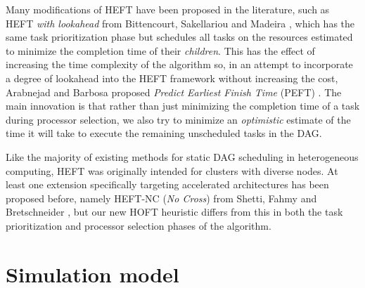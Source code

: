 \documentclass[runningheads]{llncs}
\begin{document}
Many modifications of HEFT have been proposed in the literature, such as HEFT {\em with lookahead} from Bittencourt, Sakellariou and Madeira \cite{bittencourt10}, which has the same task prioritization phase but schedules all tasks on the resources estimated to minimize the completion time of their {\em children}. This has the effect of increasing the time complexity of the algorithm so, in an attempt to incorporate a degree of lookahead into the HEFT framework without increasing the cost, Arabnejad and Barbosa proposed {\em Predict Earliest Finish Time} (PEFT) \cite{arabnejad14}. The main innovation is that rather than just minimizing the completion time of a task during processor selection, we also try to minimize an {\em optimistic} estimate of the time it will take to execute the remaining unscheduled tasks in the DAG. %

Like the majority of existing methods for static DAG scheduling in heterogeneous computing, HEFT was originally intended for clusters with diverse nodes. At least one extension specifically targeting accelerated architectures has been proposed before, namely HEFT-NC ({\em No Cross}) from Shetti, Fahmy and Bretschneider \cite{shetti2013optimization}, but our new HOFT heuristic differs from this in both the task prioritization and processor selection phases of the algorithm.




\section{Simulation model}
\label{sect.simulator}
\end{document}
